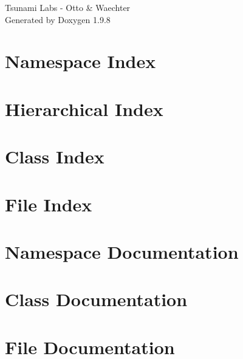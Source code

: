 \documentclass[twoside]{book}
\newcommand{\+}{\discretionary{\mbox{\scriptsize$\hookleftarrow$}}{}{}}
\newcommand{\clearemptydoublepage}{%
    \newpage{\pagestyle{empty}\cleardoublepage}%
  }
\begin{document}
  \raggedbottom
    \hypersetup{pageanchor=false,
                bookmarksnumbered=true,
                pdfencoding=unicode
               }
  \begin{titlepage}
  \vspace*{7cm}
  \begin{center}%
  {\Large Tsunami Labs -\/ Otto \& Waechter}\\
  \vspace*{1cm}
  {\large Generated by Doxygen 1.9.8}\\
  \end{center}
  \end{titlepage}
  \clearemptydoublepage
  \tableofcontents
  \clearemptydoublepage
  \hypersetup{pageanchor=true}
\chapter{Namespace Index}

\chapter{Hierarchical Index}

\chapter{Class Index}

\chapter{File Index}

\chapter{Namespace Documentation}

\chapter{Class Documentation}







\chapter{File Documentation}








  \backmatter
  \newpage
  \clearemptydoublepage
  \printindex
\end{document}
